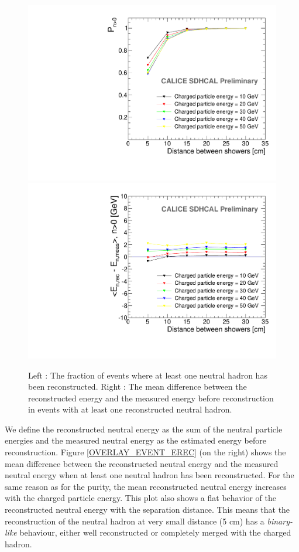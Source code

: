 \documentclass[12pt]{article}
\begin{document}
\begin{figure}[!h]
  \begin{center}
    \includegraphics[width=0.47\linewidth]{plots/OverlayEvent_NeutralPercentage.pdf}
    \includegraphics[width=0.47\linewidth]{plots/OverlayEvent_NeutralEnergyDifferenceMeanNeutralEfficient.pdf}
  \end{center}
  \caption{\label{OVERLAY_EVENT_EREC} \label{OVERLAY_EVENT_NEUTRAL_PERCENTAGE} Left : The fraction of events where at least one neutral hadron has been reconstructed. Right : The mean difference between the reconstructed energy and the measured energy before reconstruction in events with at least one reconstructed neutral hadron.}
\end{figure}

We define the reconstructed neutral energy as the sum of the neutral particle energies and the measured neutral energy as the estimated energy before reconstruction. Figure \ref{OVERLAY_EVENT_EREC} (on the right) shows the mean difference between the reconstructed neutral energy and the measured neutral energy when at least one neutral hadron has been reconstructed. For the same reason as for the purity, the mean reconstructed neutral energy increases with the charged particle energy. This plot also shows a flat behavior of the reconstructed neutral energy with the separation distance. This means that the reconstruction of the neutral hadron at very small distance (5 cm) has a \textit{binary-like} behaviour, either well reconstructed or completely merged with the charged hadron.

\newpage
\end{document}
